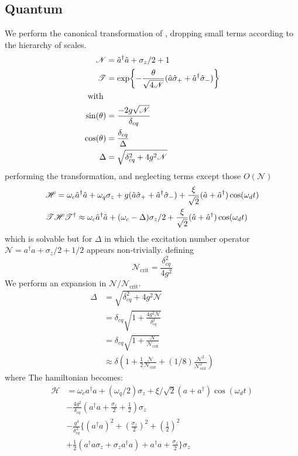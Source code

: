 \subsection{Quantum}
We perform the canonical transformation of \cite{Carbonaro1979}, dropping small terms according to the hierarchy of scales.
\begin{align*}
  \mathscr{N} &= {\hat{a}^\dagger} \hat{a} + \sigma_z/2+ 1\\
  \mathscr{T} &= \exp{-\frac{\theta}{\sqrt{4\mathscr{N}}} (\hat{a}\hat{\sigma}_++ {\hat{a}^\dagger}\hat{\sigma}_-)}\\
  \text{with }&\\
  \sin(\theta) &= \frac{-2g\sqrt{\mathscr{N}}}{\delta_{cq}}\\
  \cos(\theta) &= \frac{\delta_{cq}}{\Delta}\\
  \Delta &= \sqrt{\delta_{cq}^2+4g^2 \mathscr{N}}
\end{align*}
performing the transformation, and neglecting terms except those $O\left(\mathscr{N}\right)$
\begin{align*}
  &\mathscr{H} = \omega_c {\hat{a}^\dagger} \hat{a} + \omega_q \sigma_z + g(\hat{a}\hat{\sigma}_+ + {\hat{a}^\dagger} \hat{\sigma}_-) + \frac{\xi}{\sqrt{2}} (\hat{a} + {\hat{a}^\dagger} ) \cos(\omega_d t) \\
  &\mathscr{T}\mathscr{H}\mathscr{T}^\dagger \approx \omega_c {\hat{a}^\dagger} \hat{a} + ( \omega_c - \Delta ) \sigma_z /2 + \frac{\xi}{\sqrt{2}} (\hat{a} + {\hat{a}^\dagger} ) \cos(\omega_d t)
\end{align*}
which is solvable but for $\Delta$ in which the excitation number operator $\mathscr{N} = a ^ \dagger a + \sigma_z/2 + 1/2$ appears non-trivially. 
defining
\begin{equation}
    \mathscr{N}_{\text{crit}} = \frac{\delta_{cq}^2}{4g^2}
\end{equation}
We perform an expansion in $\mathscr{N}/\mathscr{N}_{\text{crit}}$.
\begin{align}
    \Delta &= \sqrt{\delta_{cq}^2 + 4g^2 \mathscr{N}}\\
           &= \delta_{cq} \sqrt{1 + \frac{4g^2\mathscr{N}}{\delta_{cq}^2}}\\
           &= \delta_{cq} \sqrt{1 + \frac{\mathscr{N}}{\mathscr{N}_{\text{crit}}}}\\
           & \approx \delta \left(
             1
             + \frac{1}{2}\frac{\mathscr{N}}{\mathscr{N}_{\text{crit}}}
             + (1/8) \frac{\mathscr{N}^2}{\mathscr{N}^2_{\text{crit}}}
             \right)
\end{align}
where 
The hamiltonian becomes:
\begin{align}
    \mathscr{H} &= \omega_c a ^ \dagger a
    + (\omega_q/2) \sigma_z
    +  \xi/\sqrt{2} (a + a^\dagger) \cos(\omega_d t)\\
    &- \frac{4g^2}{\delta_{cq}}\left(a^\dagger a 
    +  \frac{\sigma_z}{2} + \frac{1}{2}\right)\sigma_z\\
    &- \frac{g^4}{\delta_{cq}^3}\Big\{
    \left(a^\dagger a\right)^2
    + \left(\frac{\sigma_z}{2}\right)^2
    + \left(\frac{1}{2}\right)^2\\
    &+ \frac{1}{2} \left(
                    a^\dagger a \sigma_z + \sigma_z a^\dagger a
                  \right)
    + a^\dagger a + \frac{\sigma_z}{2}
    \Big\} 
    \sigma_z
\end{align}
